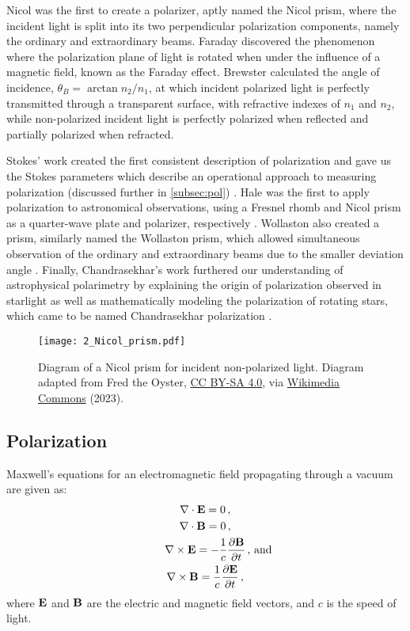 Nicol was the first to create a polarizer, aptly named the Nicol prism, where the incident light is split into its two perpendicular polarization components, namely the ordinary and extraordinary beams.
Faraday discovered the phenomenon where the polarization plane of light is rotated when under the influence of a magnetic field, known as the Faraday effect.
Brewster calculated the angle of incidence, $\theta_{B} = \arctan{n_{2} / n_{1}}$, at which incident polarized light is perfectly transmitted through a transparent surface, with refractive indexes of $n_{1}$ and $n_{2}$, while non-polarized incident light is perfectly polarized when reflected and partially polarized when refracted.

Stokes' work created the first consistent description of polarization and gave us the Stokes parameters which describe an operational approach to measuring polarization (discussed further in \autoref{subsec:pol}) \citep{Stokes}.
Hale was the first to apply polarization to astronomical observations, using a Fresnel rhomb and Nicol prism as a quarter-wave plate and polarizer, respectively \citep{Hale_pre,Hale_post}.
Wollaston also created a prism, similarly named the Wollaston prism, which allowed simultaneous observation of the ordinary and extraordinary beams due to the smaller deviation angle \citep{WollPrism}.
Finally, Chandrasekhar's work furthered our understanding of astrophysical polarimetry by explaining the origin of polarization observed in starlight as well as mathematically modeling the polarization of rotating stars, which came to be named Chandrasekhar polarization \citep{chandrasekhar}.

\begin{figure}[t]
    \centering
    \texttt{[image: 2\_Nicol\_prism.pdf]}
    \caption{
        Diagram of a Nicol prism for incident non-polarized light.
        Diagram adapted from Fred the Oyster, \protect\href{https://creativecommons.org/licenses/by-sa/4.0/}{CC BY-SA 4.0}, via \protect\href{https://en.m.wikipedia.org/wiki/File:Nicol_prism.svg}{Wikimedia Commons} (2023).
    }
    \label{fig:Nicol_prism}
\end{figure}

\subsection{Polarization} \label{subsec:pol}

Maxwell's equations for an electromagnetic field propagating through a vacuum are given as:
\begin{equation} \label{eq:Maxwell}
    \begin{gathered}
        \nabla \cdot \matr{E} = 0 \,,\\
        \nabla \cdot \matr{B} = 0 \,,\\
        \nabla \times \matr{E} = - \frac{1}{c} \frac{\partial \matr{B}}{\partial t} \rlap{\,,\ and}\\
        \nabla \times \matr{B} = \frac{1}{c} \frac{\partial \matr{E}}{\partial t}\,,
    \end{gathered}
\end{equation}
where $\mathbf{E}$ and $\mathbf{B}$ are the electric and magnetic field vectors, and $c$ is the speed of light.

